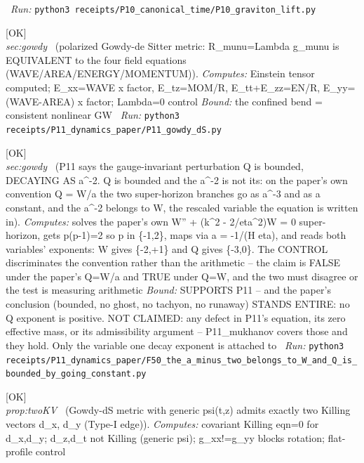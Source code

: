 \begin{description}
\ \emph{Run:} \texttt{python3 receipts/P10\_canonical\_time/P10\_graviton\_lift.py}
\item[\label{rcpt:P11_gowdy_dS}\texttt{P11\_gowdy\_dS}]\hfill\textsf{[OK]}\\
\textit{sec:gowdy} \ (polarized Gowdy-de Sitter metric: R\_munu=Lambda g\_munu is EQUIVALENT to the four field equations (WAVE/AREA/ENERGY/MOMENTUM)). 
\emph{Computes:} Einstein tensor computed; E\_xx=WAVE x factor, E\_tz=MOM/R, E\_tt+E\_zz=EN/R, E\_yy=(WAVE-AREA) x factor; Lambda=0 control
 \emph{Bound:} the confined bend = consistent nonlinear GW
\ \emph{Run:} \texttt{python3 receipts/P11\_dynamics\_paper/P11\_gowdy\_dS.py}
\item[\label{rcpt:F50_the_a_minus_two_belongs_to_W_and_Q_is_bounded_by_going_constant}\texttt{F50\_the\_a\_minus\_two\_belongs\_to\_W\_and\_Q\_is\_bounded\_by\_going\_constant}]\hfill\textsf{[OK]}\\
\textit{sec:gowdy} \ (P11 says the gauge-invariant perturbation Q is bounded, DECAYING AS a\textasciicircum{}-2. Q is bounded and the a\textasciicircum{}-2 is not its: on the paper's own convention Q = W/a the two super-horizon branches go as a\textasciicircum{}-3 and as a constant, and the a\textasciicircum{}-2 belongs to W, the rescaled variable the equation is written in). 
\emph{Computes:} solves the paper's own W'' + (k\textasciicircum{}2 - 2/eta\textasciicircum{}2)W = 0 super-horizon, gets p(p-1)=2 so p in \{-1,2\}, maps via a = -1/(H eta), and reads both variables' exponents: W gives \{-2,+1\} and Q gives \{-3,0\}. The CONTROL discriminates the convention rather than the arithmetic -- the claim is FALSE under the paper's Q=W/a and TRUE under Q=W, and the two must disagree or the test is measuring arithmetic
 \emph{Bound:} SUPPORTS P11 -- and the paper's conclusion (bounded, no ghost, no tachyon, no runaway) STANDS ENTIRE: no Q exponent is positive. NOT CLAIMED: any defect in P11's equation, its zero effective mass, or its admissibility argument -- P11\_mukhanov covers those and they hold. Only the variable one decay exponent is attached to
\ \emph{Run:} \texttt{python3 receipts/P11\_dynamics\_paper/F50\_the\_a\_minus\_two\_belongs\_to\_W\_and\_Q\_is\_bounded\_by\_going\_constant.py}
\item[\label{rcpt:P11_twoKV}\texttt{P11\_twoKV}]\hfill\textsf{[OK]}\\
\textit{prop:twoKV} \ (Gowdy-dS metric with generic psi(t,z) admits exactly two Killing vectors d\_x, d\_y (Type-I edge)). 
\emph{Computes:} covariant Killing eqn=0 for d\_x,d\_y; d\_z,d\_t not Killing (generic psi); g\_xx!=g\_yy blocks rotation; flat-profile control

\end{description}
